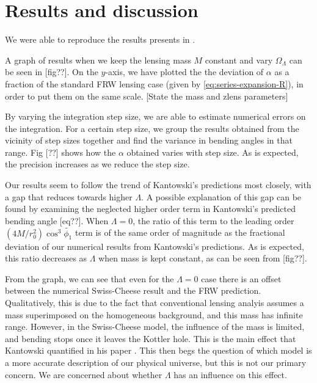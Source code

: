 \chapter{Results and discussion}
\label{chapter:results}

We were able to reproduce the results presents in \citet{schucker2009strong}. 

A graph of results when we keep the lensing mass $M$ constant and vary $\Omega_{\Lambda}$ can be seen in [fig??]. On the $y$-axis, we have plotted the the deviation of $\alpha$ as a fraction of the standard FRW lensing case (given by \autoref{eq:series-expansion-R}), in order to put them on the same scale. [State the mass and zlens parameters] 

By varying the integration step size, we are able to estimate numerical errors on the integration. For a certain step size, we group the results obtained from the vicinity of step sizes together and find the variance in bending angles in that range. Fig [??] shows how the $\alpha$ obtained varies with step size. As is expected, the precision increases as we reduce the step size. 

Our results seem to follow the trend of Kantowski's predictions most closely, with a gap that reduces towards higher $\Lambda$. A possible explanation of this gap can be found by examining the neglected higher order term in Kantowski's predicted bending angle [eq??]. When $\Lambda = 0$, the ratio of this term to the leading order $(4M/r_0^2) \cos^3 \tilde{\phi_1}$ term is of the same order of magnitude as the fractional deviation of our numerical results from Kantowski's predictions. As is expected, this ratio decreases as $\Lambda$ when mass is kept constant, as can be seen from [fig??]. 

From the graph, we can see that even for the $\Lambda = 0$ case there is an offset between the numerical Swiss-Cheese result and the FRW prediction. Qualitatively, this is due to the fact that conventional lensing analyis assumes a mass superimposed on the homogeneous background, and this mass has infinite range. However, in the Swiss-Cheese model, the influence of the mass is limited, and bending stops once it leaves the Kottler hole. This is the main effect that Kantowski quantified in his paper \citet{kantowski2010gravitational}. This then begs the question of which model is a more accurate description of our physical universe, but this is not our primary concern. We are concerned about whether $\Lambda$ has an influence on this effect. 

